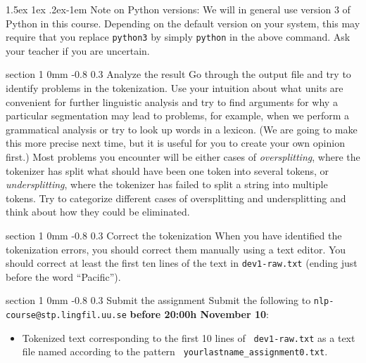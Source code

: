 \documentclass[11pt]{article}
\makeatletter
\newcommand{\newsec}[2]{\section{#1}\label{sec:#2}\noindent}
\renewcommand{\section}{\@startsection
{section}%
{1}%
{0mm}%
{-0.8\baselineskip}%
{0.3\baselineskip}%
{\bfseries\large}}%
\renewcommand{\paragraph}{%
  \@startsection{paragraph}{4}%
  {\z@}{1.5ex \@plus 1ex \@minus .2ex}{-1em}%
  {\normalfont\normalsize\bfseries}%
}\makeatother
\makeatother
\begin{document}
\paragraph{Note on Python versions:} 
We will in general use version 3 of Python in this course. Depending
on the default version on your system, this may require that you
replace {\tt python3} by simply {\tt python} in the above command.
Ask your teacher if you are uncertain.

\newsec{Analyze the result}{analyse}%
Go through the output file and try to identify problems in the
tokenization. Use your intuition about what units are convenient for
further linguistic analysis and try to find arguments for why a
particular segmentation may lead to problems, for example, when we
perform a grammatical analysis or try to look up words in a
lexicon. (We are going to make this more precise next time, but it is
useful for you to create your own opinion first.)  Most problems you
encounter will be either cases of \emph{oversplitting}, where the
tokenizer has split what should have been one token into several
tokens, or \emph{undersplitting}, where the tokenizer has failed to
split a string into multiple tokens. Try to categorize different cases
of oversplitting and undersplitting and think about how they could be
eliminated.

\newsec{Correct the tokenization}{correct}%
When you have identified the tokenization errors, you should correct
them manually using a text editor. You should correct at least the
first ten lines of the text in {\tt dev1-raw.txt} (ending just before
the word ``Pacific'').

\newsec{Submit the assignment}{submit}%
Submit the following to {\tt nlp-course@stp.lingfil.uu.se} {\bf before 20:00h November 10}: 
\begin{itemize}[noitemsep,topsep=0.2cm]
\item Tokenized text corresponding to the first 10 lines of {\tt
    dev1-raw.txt} as a text file named according to the pattern {\tt
    yourlastname\_assignment0.txt}. %
\end{itemize}

\end{document}
